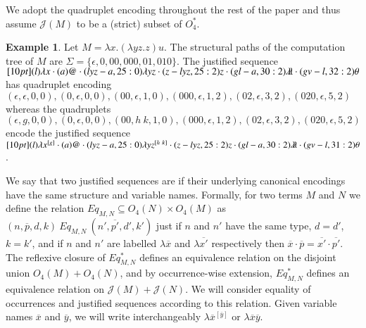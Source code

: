 \documentclass{elsarticle}
\theoremstyle{plain}
\theoremstyle{definition}
\newtheorem{example}{Example}[section]
\theoremstyle{remark}
\newcommand{\ghostlmd}{{\lambda\!\!\lambda}}
\newcommand{\ghostvar}{\theta}
\def\justseqset{\mathcal{J}}
\begin{document}
We adopt the quadruplet encoding throughout the rest of the paper and thus assume $\justseqset(M)$ to be a (strict) subset of $O_4^*$.
%
%
%

\begin{example}
\label{examp:ghost_materialization}
    Let $M = \lambda x. (\lambda y z.z) u$. The structural paths of the computation tree of $M$ are $\Sigma = \{\epsilon, 0, 00,000, 01,010\}$. The justified sequence
    $\Pstr[10pt]{
        (l){\lambda x} \cdot (a)@ \cdot (lyz-a,25:0){\lambda y z} \cdot (z-lyz,25:2)z \cdot (gl-a,30:2)\ghostlmd \cdot (gv-l,32:2)\ghostvar }
    $
    has quadruplet encoding
    $(\epsilon, \epsilon ,0,0), (0,\epsilon,0,0), (00, \epsilon, 1,0), (000,\epsilon, 1,2), (02,\epsilon,3,2), (020,\epsilon,5,2) $ whereas the quadruplets $ (\epsilon, g ,0,0), (0,\epsilon,0,0), (00, h~k, 1,0), (000,\epsilon, 1,2), (02,\epsilon,3,2), (020,\epsilon,5,2) $ encode the justified sequence
    $\Pstr[10pt]{
        (l){\lambda x^{[g]}} \cdot (a)@ \cdot (lyz-a,25:0){\lambda y z^{[h~k]}} \cdot (z-lyz,25:2)z \cdot (gl-a,30:2)\ghostlmd \cdot (gv-l,31:2)\ghostvar }
    $.
\end{example}

We say that two justified sequences are  if their underlying canonical encodings have the same structure and variable names. Formally, for two terms $M$ and $N$ we define the relation
$Eq_{M,N} \subseteq O_4(N) \times O_4(M)$ as $(n,\overline{p},d,k)~Eq_{M,N}~(n',\overline{p'},d',k')$
just if  $n$ and $n'$ have the same type, $d = d'$, $k = k'$, and if $n$ and $n'$ are labelled $\lambda\overline{x}$ and $\lambda\overline{x'}$ respectively then $\overline{x} \cdot \overline{p} = \overline{x'} \cdot \overline{p'}$.
The reflexive closure of $Eq_{M,N}^*$ defines an equivalence relation on
 the disjoint union $O_4(M) + O_4(N)$, and by occurrence-wise extension, $Eq_{M,N}^*$ defines an equivalence relation on $\justseqset(M) + \justseqset(N)$.
 We will consider equality of occurrences and justified sequences according to this relation.  Given variable names $\overline{x}$ and $\overline{y}$, we will write interchangeably $\lambda\overline{x}^{[\overline{y}]}$ or $\lambda\overline{x}\overline{y}$.
\end{document}
